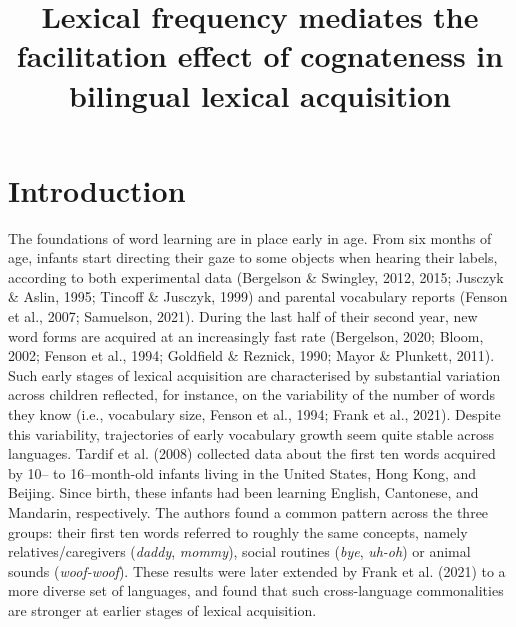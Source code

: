 \documentclass[
  man,
  floatsintext,
  colorlinks=true,linkcolor=blue,citecolor=blue,urlcolor=blue,biblatex]{apa7}
\title{Lexical frequency mediates the facilitation effect of cognateness
in bilingual lexical acquisition}
\date{}
\begin{document}
\maketitle
\ifdefined\Shaded\renewenvironment{Shaded}{\begin{tcolorbox}[frame hidden, boxrule=0pt, borderline west={3pt}{0pt}{shadecolor}, interior hidden, sharp corners, breakable, enhanced]}{\end{tcolorbox}}\fi
\hypertarget{introduction}{%
\section{Introduction}\label{introduction}}

The foundations of word learning are in place early in age. From six
months of age, infants start directing their gaze to some objects when
hearing their labels, according to both experimental data (Bergelson \&
Swingley, 2012, 2015; Jusczyk \& Aslin, 1995; Tincoff \& Jusczyk, 1999)
and parental vocabulary reports (Fenson et al., 2007; Samuelson, 2021).
During the last half of their second year, new word forms are acquired
at an increasingly fast rate (Bergelson, 2020; Bloom, 2002; Fenson et
al., 1994; Goldfield \& Reznick, 1990; Mayor \& Plunkett, 2011). Such
early stages of lexical acquisition are characterised by substantial
variation across children reflected, for instance, on the variability of
the number of words they know (i.e., vocabulary size, Fenson et al.,
1994; Frank et al., 2021). Despite this variability, trajectories of
early vocabulary growth seem quite stable across languages. Tardif et
al. (2008) collected data about the first ten words acquired by 10-- to
16--month-old infants living in the United States, Hong Kong, and
Beijing. Since birth, these infants had been learning English,
Cantonese, and Mandarin, respectively. The authors found a common
pattern across the three groups: their first ten words referred to
roughly the same concepts, namely relatives/caregivers (\emph{daddy},
\emph{mommy}), social routines (\emph{bye}, \emph{uh-oh}) or animal
sounds (\emph{woof-woof}). These results were later extended by Frank et
al. (2021) to a more diverse set of languages, and found that such
cross-language commonalities are stronger at earlier stages of lexical
acquisition.
\end{document}
